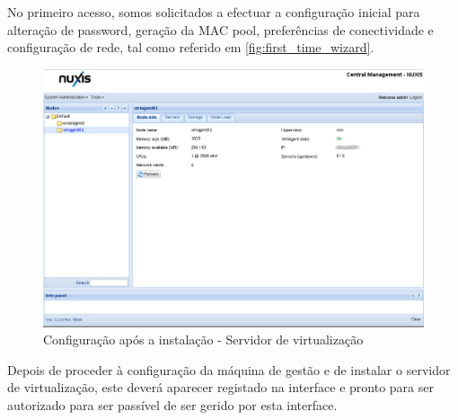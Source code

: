 No primeiro acesso, somos solicitados a efectuar a configuração inicial para alteração de password, geração da MAC pool, preferências de conectividade e configuração de rede, tal como referido em  \ref{fig:first_time_wizard}.

\begin{figure}[H]
	\begin{center}
    \includegraphics[scale=0.4]{screenshots/install/nuxis/nuxis_enterprise_wiz_install_28.png}
    \caption{Configuração após a instalação - Servidor de virtualização}
	\label{fig:installation_enterprise_wiz_02}
	\end{center}
\end{figure}

Depois de proceder à configuração da máquina de gestão e de instalar o servidor de virtualização, este deverá aparecer registado na interface e pronto para ser autorizado para ser passível de ser gerido por esta interface.

\pagebreak
